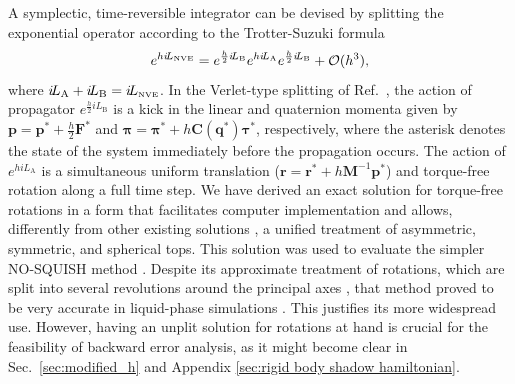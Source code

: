 \documentclass[
journal=jctcce,
layout=twocolumn
]{achemso}
\newcommand{\mt}[1]{\boldsymbol{\mathbf{#1}}}   %
\newcommand{\vt}[1]{\boldsymbol{\mathbf{#1}}}   %
\newcommand{\Liu}[1]{i\!L_\text{#1}}            %
\newcommand{\timestep}{h}
\begin{document}
A symplectic, time-reversible integrator can be devised by splitting the exponential operator according to the Trotter-Suzuki formula \cite{Trotter_1959, Suzuki_1976}
\begin{equation}
\label{eq:splitting NVE}
e^{\timestep \Liu{\tiny NVE}} = e^{\frac{\timestep}{2} \Liu{B}} e^{\timestep \Liu{A}} e^{\frac{\timestep}{2} \Liu{B}} + \mathcal{O}(\timestep^3),
\end{equation}
where $\Liu{A} + \Liu{B} = \Liu{\tiny NVE}$.
In the Verlet-type splitting of Ref.~, the action of propagator $e^{\frac{\timestep}{2} \Liu{B}}$ is a kick in the linear and quaternion momenta given by ${\vt p} = {\vt p}^\ast + \frac{\timestep}{2} {\vt F}^\ast$ and ${\vt \pi} = {\vt \pi}^\ast + \timestep {\mt C}({\vt q^\ast}) {\vt \tau}^\ast$, respectively, where the asterisk denotes the state of the system immediately before the propagation occurs.
The action of $e^{\timestep \Liu{A}}$ is a simultaneous uniform translation (${\vt r} = {\vt r}^\ast + \timestep {\mt M}^{-1} {\vt p}^\ast$) and torque-free rotation along a full time step.
We have derived \cite{Silveira_2017} an exact solution for torque-free rotations in a form that facilitates computer implementation and allows, differently from other existing solutions \cite{Kosenko_1998, vanZon2007, Celledoni_2008}, a unified treatment of asymmetric, symmetric, and spherical tops.
This solution was used to evaluate the simpler NO-SQUISH method \cite{Miller_2002}.
Despite its approximate treatment of rotations, which are split into several revolutions around the principal axes \cite{Dullweber_1997}, that method proved to be very accurate in liquid-phase simulations \cite{Silveira_2017}.
This justifies its more widespread use.
However, having an unplit solution for rotations at hand is crucial for the feasibility of backward error analysis, as it might become clear in Sec.~\ref{sec:modified_h} and Appendix \ref{sec:rigid body shadow hamiltonian}.
\end{document}
